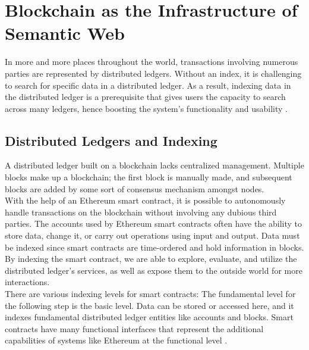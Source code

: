 \chapter{Blockchain as the Infrastructure of Semantic Web}
In more and more places throughout the world, transactions involving numerous parties are represented by distributed ledgers. Without an index, it is challenging to search for specific data in a distributed ledger. As a result, indexing data in the distributed ledger is a prerequisite that gives users the capacity to search across many ledgers, hence boosting the system's functionality and usability \cite{Third}.
\section{Distributed Ledgers and Indexing}
A distributed ledger built on a blockchain lacks centralized management. Multiple blocks make up a blockchain; the first block is manually made, and subsequent blocks are added by some sort of consensus mechanism amongst nodes. \\
With the help of an Ethereum smart contract, it is possible to autonomously handle transactions on the blockchain without involving any dubious third parties. The accounts used by Ethereum smart contracts often have the ability to store data, change it, or carry out operations using input and output.
Data must be indexed since smart contracts are time-ordered and hold information in blocks. By indexing the smart contract, we are able to explore, evaluate, and utilize the distributed ledger's services, as well as expose them to the outside world for more interactions. \\
There are various indexing levels for smart contracts: The fundamental level for the following step is the basic level. Data can be stored or accessed here, and it indexes fundamental distributed ledger entities like accounts and blocks. Smart contracts have many functional interfaces that represent the additional capabilities of systems like Ethereum at the functional level \cite{Third}.
